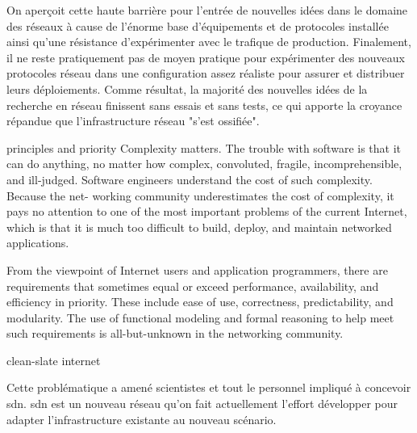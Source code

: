 \par
On aperçoit cette haute barrière pour l'entrée de nouvelles idées dans le domaine des réseaux à cause de l'énorme base d'équipements et de protocoles installée ainsi qu'une résistance d'expérimenter avec le trafique de production. Finalement, il ne reste pratiquement pas de moyen pratique pour expérimenter des nouveaux protocoles réseau dans une configuration assez réaliste pour assurer et distribuer leurs déploiements. Comme résultat, la majorité des nouvelles idées de la recherche en réseau finissent sans essais et sans tests, ce qui apporte la croyance répandue que l'infrastructure réseau "s'est ossifiée". \cite{OpenFlowStanford} 


principles and priority
Complexity matters. The trouble with software is that it can do anything,
no matter how complex, convoluted, fragile, incomprehensible, and ill-judged.
Software engineers understand the cost of such complexity. Because the net-
working community underestimates the cost of complexity, it pays no attention
to one of the most important problems of the current Internet, which is that it
is much too difficult to build, deploy, and maintain networked applications.


From the viewpoint of Internet users and application programmers, there
are requirements that sometimes equal or exceed performance, availability, and
efficiency in priority. These include ease of use, correctness, predictability, and
modularity. The use of functional modeling and formal reasoning to help meet
such requirements is all-but-unknown in the networking community.







clean-slate internet




Cette problématique a amené scientistes et tout le personnel impliqué à concevoir \gls{sdn}. \gls{sdn} est un nouveau  réseau qu'on fait actuellement l'effort développer pour adapter l'infrastructure existante au nouveau scénario.